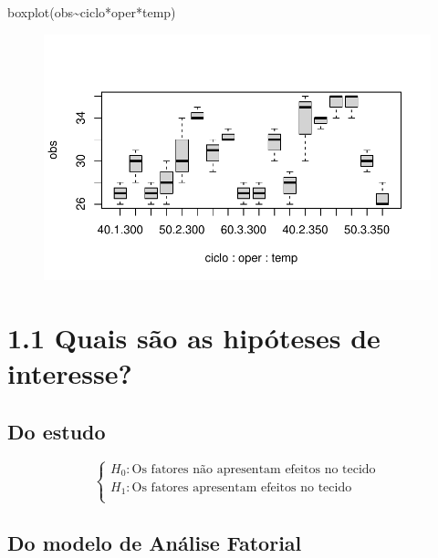 \documentclass[
  letterpaper,
  DIV=11,
  numbers=noendperiod]{scrartcl}
\newenvironment{Shaded}{\begin{snugshade}}{\end{snugshade}}
\newcommand{\FunctionTok}[1]{\textcolor[rgb]{0.28,0.35,0.67}{#1}}
\newcommand{\NormalTok}[1]{\textcolor[rgb]{0.00,0.23,0.31}{#1}}
\newcommand{\SpecialCharTok}[1]{\textcolor[rgb]{0.37,0.37,0.37}{#1}}
\begin{document}
\begin{Shaded}
\begin{Highlighting}[]
\FunctionTok{boxplot}\NormalTok{(obs}\SpecialCharTok{\textasciitilde{}}\NormalTok{ciclo}\SpecialCharTok{*}\NormalTok{oper}\SpecialCharTok{*}\NormalTok{temp)}
\end{Highlighting}
\end{Shaded}

\begin{figure}[H]

{\centering \includegraphics{fatorial_multi_files/figure-pdf/unnamed-chunk-3-4.pdf}

}

\end{figure}

\hypertarget{quais-suxe3o-as-hipuxf3teses-de-interesse}{%
\section{1.1 Quais são as hipóteses de
interesse?}\label{quais-suxe3o-as-hipuxf3teses-de-interesse}}

\hypertarget{do-estudo}{%
\subsection{Do estudo}\label{do-estudo}}

\[\begin{cases}
H_{0}: \mbox{Os fatores não apresentam efeitos no tecido} \\
H_{1}: \mbox{Os fatores apresentam efeitos no tecido}\\
\end{cases}\]

\hypertarget{do-modelo-de-anuxe1lise-fatorial}{%
\subsection{Do modelo de Análise
Fatorial}\label{do-modelo-de-anuxe1lise-fatorial}}
\end{document}

